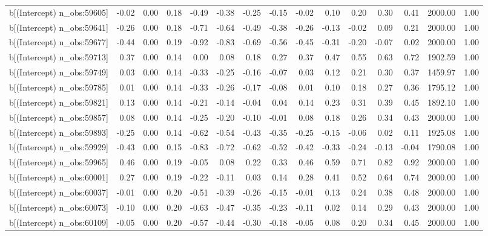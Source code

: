 \begin{table}[ht]
\begin{tabular}{rrrrrrrrrrrrrrr}
  b[(Intercept) n\_obs:59605] & -0.02 & 0.00 & 0.18 & -0.49 & -0.38 & -0.25 & -0.15 & -0.02 & 0.10 & 0.20 & 0.30 & 0.41 & 2000.00 & 1.00 \\ 
  b[(Intercept) n\_obs:59641] & -0.26 & 0.00 & 0.18 & -0.71 & -0.64 & -0.49 & -0.38 & -0.26 & -0.13 & -0.02 & 0.09 & 0.21 & 2000.00 & 1.00 \\ 
  b[(Intercept) n\_obs:59677] & -0.44 & 0.00 & 0.19 & -0.92 & -0.83 & -0.69 & -0.56 & -0.45 & -0.31 & -0.20 & -0.07 & 0.02 & 2000.00 & 1.00 \\ 
  b[(Intercept) n\_obs:59713] & 0.37 & 0.00 & 0.14 & 0.00 & 0.08 & 0.18 & 0.27 & 0.37 & 0.47 & 0.55 & 0.63 & 0.72 & 1902.59 & 1.00 \\ 
  b[(Intercept) n\_obs:59749] & 0.03 & 0.00 & 0.14 & -0.33 & -0.25 & -0.16 & -0.07 & 0.03 & 0.12 & 0.21 & 0.30 & 0.37 & 1459.97 & 1.00 \\ 
  b[(Intercept) n\_obs:59785] & 0.01 & 0.00 & 0.14 & -0.33 & -0.26 & -0.17 & -0.08 & 0.01 & 0.10 & 0.18 & 0.27 & 0.36 & 1795.12 & 1.00 \\ 
  b[(Intercept) n\_obs:59821] & 0.13 & 0.00 & 0.14 & -0.21 & -0.14 & -0.04 & 0.04 & 0.14 & 0.23 & 0.31 & 0.39 & 0.45 & 1892.10 & 1.00 \\ 
  b[(Intercept) n\_obs:59857] & 0.08 & 0.00 & 0.14 & -0.25 & -0.20 & -0.10 & -0.01 & 0.08 & 0.18 & 0.26 & 0.34 & 0.43 & 2000.00 & 1.00 \\ 
  b[(Intercept) n\_obs:59893] & -0.25 & 0.00 & 0.14 & -0.62 & -0.54 & -0.43 & -0.35 & -0.25 & -0.15 & -0.06 & 0.02 & 0.11 & 1925.08 & 1.00 \\ 
  b[(Intercept) n\_obs:59929] & -0.43 & 0.00 & 0.15 & -0.83 & -0.72 & -0.62 & -0.52 & -0.42 & -0.33 & -0.24 & -0.13 & -0.04 & 1790.08 & 1.00 \\ 
  b[(Intercept) n\_obs:59965] & 0.46 & 0.00 & 0.19 & -0.05 & 0.08 & 0.22 & 0.33 & 0.46 & 0.59 & 0.71 & 0.82 & 0.92 & 2000.00 & 1.00 \\ 
  b[(Intercept) n\_obs:60001] & 0.27 & 0.00 & 0.19 & -0.22 & -0.11 & 0.03 & 0.14 & 0.28 & 0.41 & 0.52 & 0.64 & 0.74 & 2000.00 & 1.00 \\ 
  b[(Intercept) n\_obs:60037] & -0.01 & 0.00 & 0.20 & -0.51 & -0.39 & -0.26 & -0.15 & -0.01 & 0.13 & 0.24 & 0.38 & 0.48 & 2000.00 & 1.00 \\ 
  b[(Intercept) n\_obs:60073] & -0.10 & 0.00 & 0.20 & -0.63 & -0.47 & -0.35 & -0.23 & -0.11 & 0.02 & 0.14 & 0.29 & 0.43 & 2000.00 & 1.00 \\ 
  b[(Intercept) n\_obs:60109] & -0.05 & 0.00 & 0.20 & -0.57 & -0.44 & -0.30 & -0.18 & -0.05 & 0.08 & 0.20 & 0.34 & 0.45 & 2000.00 & 1.00 \\ 

\end{tabular}
\end{table}
